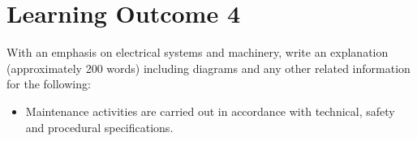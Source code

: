 \documentclass[11pt,a4paper]{article}
\begin{document}
\section{Learning Outcome 4}
\begin{tcolorbox}[colback=red!5!white,colframe=red!75!black,title=\textbf{Demonstrate basic understanding of manufacturer’s safety guidelines and shipboard instructions}]
With an emphasis on electrical systems and machinery, write an explanation (approximately 200 words) including diagrams and any other related information for the following:
\begin{itemize}
\item Maintenance activities are carried out in accordance with technical, safety and procedural specifications.
\end{itemize}
\end{tcolorbox}
\end{document}

